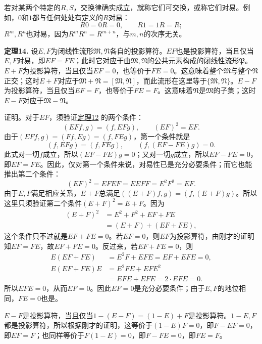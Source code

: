 \documentclass[fontsize=13pt,twoside,openany,headings=normal,parskip=false,bookmarkpackage=false,DIV=calc]{scrbook}
\newcommand{\textkaishu}[1]{{\zhkaishu #1}}
\begin{document}
\hypertarget{origpage-43}{}\label{origpage-43}若对某两个特定的$R,\allowbreak S$，交换律确实成立，就称它们可交换，或称它们对易。例如，$0$和$1$都与任何处处有定义的$R$对易：
\[
R0=0R=0,\qquad R1=1R=R;
\]
$R^m,\allowbreak R^n$也对易，因为$R^mR^n=R^{m+n}$，与$m,\allowbreak n$的次序无关。

\leavevmode{}\textbf{定理14.}\label{thm:II.14} 设$E,\allowbreak F$为闭线性流形$\mathfrak{M},\allowbreak \mathfrak{N}$各自的投影算符。$EF$也是投影算符，当且仅当$E,\allowbreak F$对易，即$EF=FE$；此时它对应于由$\mathfrak{M},\allowbreak \mathfrak{N}$的公共元素构成的闭线性流形$\mathfrak{P}$。$E+F$为投影算符，当且仅当$EF=0$，也等价于$FE=0$。这意味着整个$\mathfrak{M}$与整个$\mathfrak{N}$正交；这时$E+F$对应于$\mathfrak{M}+\mathfrak{N}=[\mathfrak{M},\allowbreak \mathfrak{N}]$，而此流形在这里等于$\{\mathfrak{M},\allowbreak \mathfrak{N}\}$。$E-F$为投影算符，当且仅当$EF=F$，也等价于$FE=F$。这意味着$\mathfrak{N}$是$\mathfrak{M}$的子集；这时$E-F$对应于$\mathfrak{M}-\mathfrak{N}$。

\textkaishu{证明。}对于$EF$，须验证\CJKglue \hyperref[thm:II.12]{定理12} 的两个条件：
\[
(EFf,g)=(f,EFg),\qquad(EF)^2=EF.
\]
由于$(EFf,\allowbreak g)=(Ff,\allowbreak Eg)=(f,\allowbreak FEg)$，第一个条件就是
\[
(f,EFg)=(f,FEg),\qquad(f,(EF-FE)g)=0.
\]
此式对一切$f$成立，所以$(EF-FE)g=0$；又对一切$g$成立，所以$EF-FE=0$，即$EF=FE$。因此，仅对第一个条件来说，对易性已是充分必要条件；而它也能推出第二个条件：
\[
(EF)^2=EFEF=EEFF=E^2F^2=EF.
\]
由于$E,\allowbreak F$满足相应关系，$E+F$总满足$((E+F)f,\allowbreak g)=(f,\allowbreak (E+F)g)$。所以这里只须验证第二个条件$(E+F)^2=E+F$。因为
\begin{align*}
(E+F)^2&=E^2+F^2+EF+FE\\
&=(E+F)+(EF+FE),
\end{align*}
这个条件只不过就是$EF+FE=0$。若$EF=0$，则$EF$为投影算符，由刚才的证明知$EF=FE$，故$EF+FE=0$。反过来，若$EF+FE=0$，则
\begin{align*}
E(EF+FE)&=E^2F+EFE=EF+EFE=0,\\
E(EF+FE)E&=E^2FE+EFE^2\\
&=EFE+EFE=2\cdot EFE=0.
\end{align*}
所以$EFE=0$，从而$EF=0$。因此$EF=0$是充分必要条件；由于$E,\allowbreak F$的地位相同，$FE=0$也是。

$E-F$是投影算符，当且仅当$1-(E-F)=(1-E)+F$是投影算符。$1-E,\allowbreak F$都是投影算符，所以根据刚才的证明，这等价于$(1-E)F=0$，即$F-EF=0$，即$EF=F$；也同样等价于$F(1-E)=0$，即$F-FE=0$，即$FE=F$。
\end{document}

